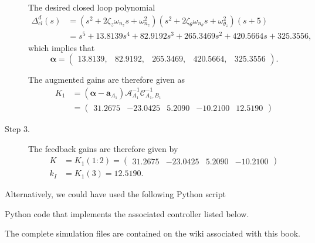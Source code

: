 \begin{description}
The desired closed loop polynomial
\begin{align*}
\Delta_{cl}^d(s) &= (s^2+2\zeta_z\omega_{n_z}s+\omega_{n_z}^2)(s^2+2\zeta_\theta\omega_{n_\theta}s+\omega_{\theta_z}^2)(s+5)\\
&=s^5 + 13.8139 s^4 +   82.9192 s^3 +  265.3469 s^2 +  420.5664 s +  325.3556,
\end{align*} 
which implies that
\[
\boldsymbol{\alpha} = \begin{pmatrix}13.8139, &   82.9192, &  265.3469, &  420.5664, &  325.3556\end{pmatrix}.
\]

The augmented gains are therefore given as
\begin{align*}
K_1 &= (\boldsymbol{\alpha}-\mathbf{a}_{A_1})\mathcal{A}_{A_1}^{-1}\mathcal{C}_{A_1,B_1}^{-1} \\
  &= \begin{pmatrix} 
  31.2675 &  -23.0425 &   5.2090 & -10.2100 &  12.5190 
  \end{pmatrix}
\end{align*}

\item[Step 3.]
The feedback gains are therefore given by
\begin{align*}
K &= K_1(1:2) = \begin{pmatrix} 
   31.2675 &  -23.0425 &   5.2090 & -10.2100
\end{pmatrix} \\
k_I &= K_1(3) = 12.5190.
\end{align*}

\end{description}

Alternatively, we could have used the following Python script
%  
%  
\ifsolutionmanual

\else

\fi

Python code that implements the associated controller listed below.
%  
%  
\ifsolutionmanual

\else

\fi


The complete simulation files are contained on the wiki associated with this book.

